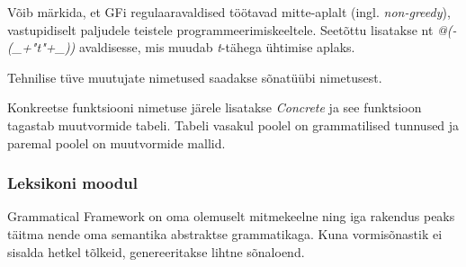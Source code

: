 \documentclass[12pt,a4paper]{article}
\begin{document}


Võib märkida, et GFi regulaaravaldised töötavad mitte-aplalt (ingl. \textit{non-greedy}), vastupidiselt paljudele teistele programmeerimis\-keeltele. Seetõttu lisatakse nt \textit{@(-(\_+"t"+\_))} avaldisesse, mis muudab \textit{t}-tähega ühtimise aplaks.

Tehnilise tüve muutujate nimetused saadakse sõnatüübi nimetusest.

Konkreetse funktsiooni nimetuse järele lisatakse \textit{Concrete} ja see funktsioon tagastab muutvormide tabeli. Tabeli vasakul poolel on grammatilised tunnused ja paremal poolel on muutvormide mallid.




\subsubsection{Leksikoni moodul}
\label{sec:gf-leksikon}

Grammatical Framework on oma olemuselt mitmekeelne ning iga rakendus peaks täitma nende oma semantika abstraktse grammatikaga. Kuna vormisõnastik ei sisalda hetkel tõlkeid, genereeritakse lihtne sõnaloend.
\end{document}
